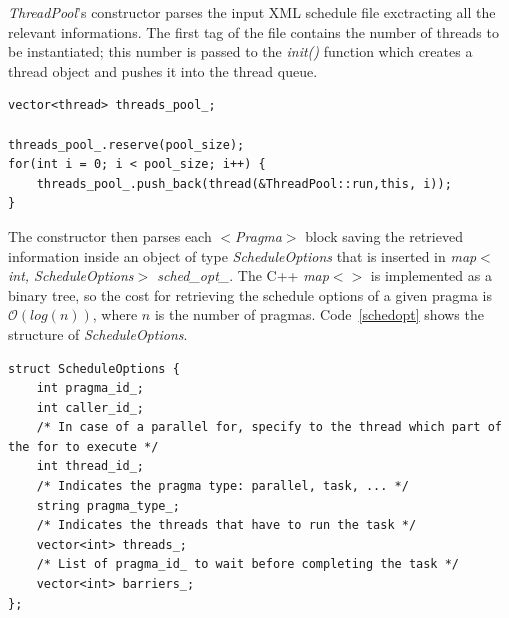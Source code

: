 \documentclass[a4paper,12pt,oneside]{book}
\begin{document}
\emph{ThreadPool}’s constructor parses the input XML schedule file exctracting all the relevant informations. The first tag of the file contains the number of threads to be instantiated; this number is passed to the \emph{init()} function which creates a thread object and pushes it into the thread queue.

\begin{lstlisting}[language=CCC, caption=Initialization of the thread pool., label=pool]
vector<thread> threads_pool_;

threads_pool_.reserve(pool_size);
for(int i = 0; i < pool_size; i++) {
    threads_pool_.push_back(thread(&ThreadPool::run,this, i));
}
\end{lstlisting}

The constructor then parses each \emph{$<$Pragma$>$} block saving the retrieved information inside an object of type \emph{ScheduleOptions} that is inserted in \emph{map$<$int, ScheduleOptions$>$ sched\_opt\_}. The C++ \emph{map$<>$} is implemented as a binary tree, so the cost for retrieving the schedule options of a given pragma is $\mathcal{O}(log(n))$, where $n$ is the number of pragmas.  Code~\ref{schedopt} shows the structure of \emph{ScheduleOptions}.

\begin{lstlisting}[language=CCC, label=schedopt]
struct ScheduleOptions {
    int pragma_id_;
    int caller_id_;
    /* In case of a parallel for, specify to the thread which part of the for to execute */
    int thread_id_;
    /* Indicates the pragma type: parallel, task, ... */
    string pragma_type_;
    /* Indicates the threads that have to run the task */
    vector<int> threads_;
    /* List of pragma_id_ to wait before completing the task */
    vector<int> barriers_;
};
\end{lstlisting}
\end{document}
